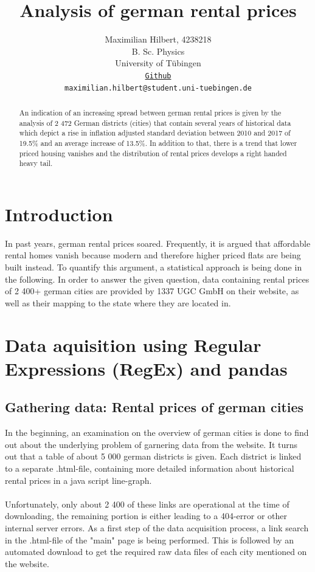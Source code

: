 \documentclass{article}
\title{Analysis of german rental prices}
\author{%
  Maximilian Hilbert, 4238218\\
  B. Sc. Physics\\
  University of Tübingen\\
  \texttt{\href{https://github.com/MaximilianHilbert/Data\_Literacy\_Project.git}{Github}}\\
  \texttt{maximilian.hilbert@student.uni-tuebingen.de}
}
\begin{document}
	\maketitle
\begin{abstract}
		An indication of an increasing spread between german rental prices is given by the analysis of 2 472 German districts (cities) that contain several years of historical data which depict a rise in inflation adjusted standard deviation between 2010 and 2017 of 19.5\% and an average increase of 13.5\%. In addition to that, there is a trend that lower priced housing vanishes and the distribution of rental prices develops a right handed heavy tail.
\end{abstract}

\section{Introduction}
	In past years, german rental prices soared. Frequently, it is argued that affordable rental homes vanish because modern and therefore higher priced flats are being built instead. To quantify this argument, a statistical approach is being done in the following. In order to answer the given question, data containing rental prices of 2 400+ german cities are provided by 1337 UGC GmbH on their website, as well as their mapping to the state where they are located in. \cite{rental_prices_city,rental_prices_states}
	
\section{Data aquisition using Regular Expressions (RegEx) and pandas}
\subsection{Gathering data: Rental prices of german cities}

	In the beginning, an examination on the overview of german cities \cite{rental_prices_city} is done to find out about the underlying problem of garnering data from the website. It turns out that a table of about 5 000 german districts is given. Each district is linked to a separate .html-file, containing more detailed information about historical rental prices in a java script line-graph. \\
	\\Unfortunately, only about 2 400 of these links are operational at the time of downloading, the remaining portion is either leading to a 404-error or other internal server errors. As a first step of the data acquisition process, a link search in the .html-file of the "main" page is being performed. This is followed by an automated download to get the required raw data files of each city mentioned on the website.
    
\end{document}
